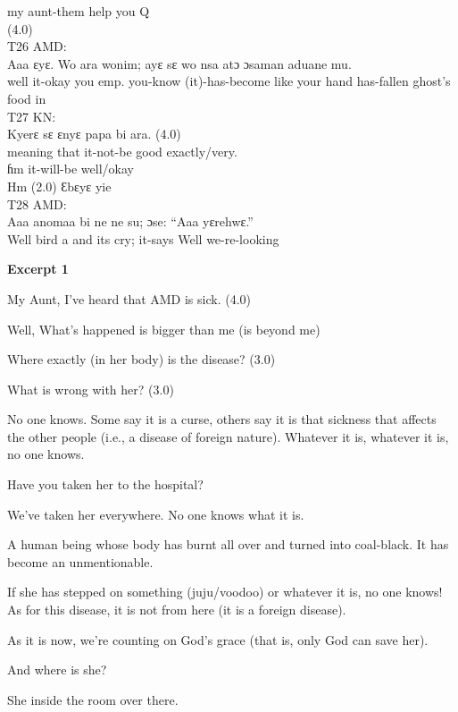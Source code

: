 \documentclass[output=paper,colorlinks,citecolor=brown]{langscibook}
\begin{document}
            my aunt-them help you Q\\
            (4.0)\\
\ex%
    T26 AMD:\\
    \gll    Aaa ɛyɛ. Wo ara wonim; ayɛ sɛ wo nsa atɔ ɔsaman aduane mu.\\
            well it-okay you emp. you-know (it)-has-become like your hand has-fallen ghost’s food in\\
\ex%
    T27 KN:\\
    \ea
    \gll    Kyerɛ sɛ ɛnyɛ papa bi ara. (4.0) \\
            meaning that it-not-be good exactly/very. \\ 
    \ex     
    \gll    ɦm it-will-be well/okay\\
            Hm (2.0) Ɛbɛyɛ yie\\
    \z
\ex%
    T28 AMD:\\
    \gll    Aaa anomaa bi ne ne su; ɔse: “Aaa yɛrehwɛ.”\\
            Well bird a and its cry; it-says Well we-re-looking \\
\z

\noindent \textbf{Excerpt 1}

\begin{description}[style=unboxed,font=\normalfont]
    \item[T1 KN:] My Aunt, I’ve heard that AMD is sick. (4.0)
    \item[T2 AB:] Well, What’s happened is bigger than me (is beyond me)
    \item[T3 KN:] Where exactly (in her body) is the disease? (3.0) 
    \item[T4 KN:] What is wrong with her? (3.0)
    \item[T5 AB:] No one knows. Some say it is a curse, others say it is that sickness that affects the other people (i.e., a disease of foreign nature). Whatever it is, whatever it is, no one knows.
    \item[T6 KN:] Have you taken her to the hospital?
    \item[T7 AB:] We’ve taken her everywhere. No one knows what it is.
    \item[T8 AG:] A human being whose body has burnt all over and turned into coal-black. It has become an unmentionable.
    \item[T9 AB:] If she has stepped on something (juju/voodoo) or whatever it is, no one knows! As for this disease, it is not from here (it is a foreign disease).
    \item[T10 AG:] As it is now, we’re counting on God’s grace (that is, only God can save her).
    \item[T11 KN:] And where is she?
    \item[T12 AB:] She inside the room over there.
\end{description}
\end{document}
